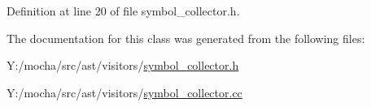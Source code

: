 Definition at line 20 of file symbol\_\-collector.h.



The documentation for this class was generated from the following files:\begin{DoxyCompactItemize}
\item 
Y:/mocha/src/ast/visitors/\hyperlink{symbol__collector_8h}{symbol\_\-collector.h}\item 
Y:/mocha/src/ast/visitors/\hyperlink{symbol__collector_8cc}{symbol\_\-collector.cc}\end{DoxyCompactItemize}
